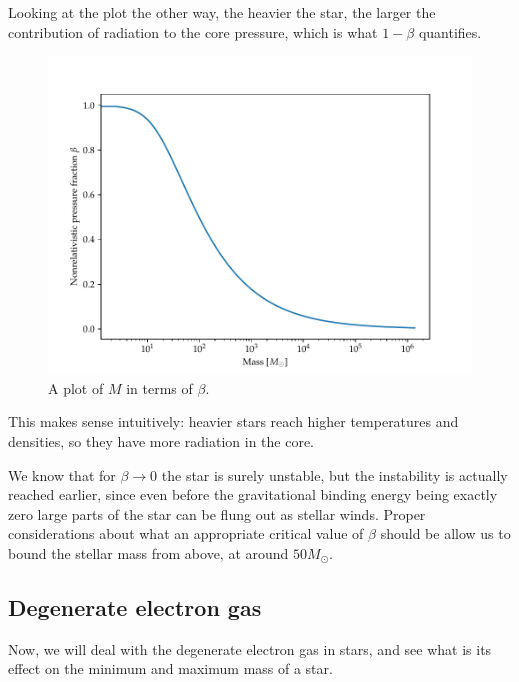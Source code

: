 \documentclass[main.tex]{subfiles}
\begin{document}
Looking at the plot the other way, the heavier the star, the larger the contribution of radiation to the core pressure, which is what \(1-\beta \) quantifies.

\begin{figure}[ht]
\centering
\includegraphics[width=\textwidth]{figures/beta_star_core_pressure.pdf}
\caption{A plot of \(M\) in terms of \(\beta \).}
\label{fig:beta-core-pressure}
\end{figure}

This makes sense intuitively: heavier stars reach higher temperatures and densities, so they have more radiation in the core. 

We know that for \(\beta \to 0\) the star is surely unstable, but the instability is actually reached earlier, since even before the gravitational binding energy being exactly zero large parts of the star can be flung out as stellar winds.
Proper considerations about what an appropriate critical value of \(\beta \) should be allow us to bound the stellar mass from above, at around \(50 M_{\odot}\). 


\subsection{Degenerate electron gas}

Now, we will deal with the degenerate electron gas in stars, and see what is its effect on the minimum and maximum mass of a star.  
\end{document}
